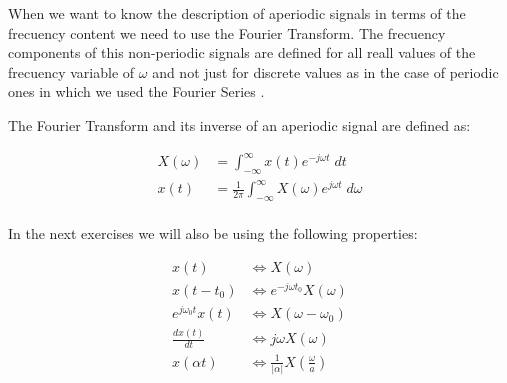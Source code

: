 When we want to know the description of aperiodic signals in terms of the 
frecuency content we need to use the Fourier Transform.
The frecuency components of this non-periodic signals are defined for all
reall values of the frecuency variable of $\omega$ and not just for discrete
values as in the case of periodic ones in which we used the Fourier Series 
\cite{kamen2000fundamentals}.

The Fourier Transform and its inverse of an aperiodic signal are defined as:

\begin{equation}
\begin{aligned}
X(\omega) &= \displaystyle\int_{-\infty}^{\infty} x(t) e^{-j \omega t} \; dt \\
x(t) &= \frac{1}{2 \pi} \displaystyle\int_{-\infty}^{\infty} X(\omega) e^{j \omega t}\; d\omega \\
\label{eq:c21}
\end{aligned}
\end{equation}

In the next exercises we will also be using the following properties:

\begin{subequations}
\begin{align}
x(t) &\Leftrightarrow X(\omega) \label{eq:c22a} \\
x(t-t_0) &\Leftrightarrow e^{-j \omega t_0} X(\omega) \label{eq:c22b}\\
e^{j \omega_0 t} x(t)  &\Leftrightarrow X(\omega - \omega_0) \label{eq:c22c}\\
\frac{dx(t)}{dt} &\Leftrightarrow j \omega X(\omega) \label{eq:c22d} \\
x(\alpha t) &\Leftrightarrow \frac{1}{|\alpha|} X\left(\frac{\omega}{a}\right) \label{eq:c22e}
\end{align}
\end{subequations}
